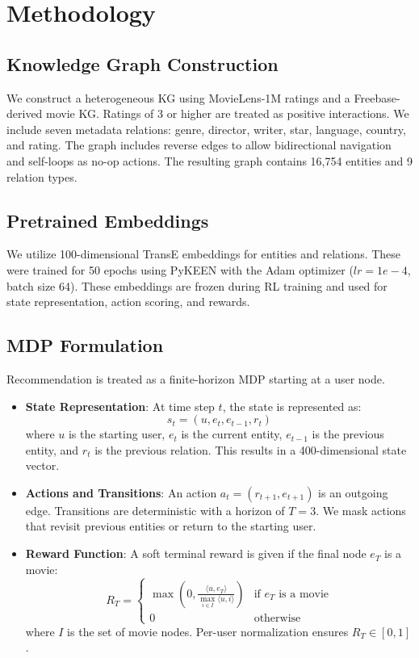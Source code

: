\documentclass{article}
\begin{document}
\section{Methodology}

\subsection{Knowledge Graph Construction}
We construct a heterogeneous KG using MovieLens-1M ratings and a Freebase-derived movie KG. Ratings of 3 or higher are treated as positive interactions. We include seven 
metadata relations: genre, director, writer, star, language, country, and rating. The graph includes reverse edges to allow bidirectional navigation and self-loops as no-op 
actions. The resulting graph contains 16,754 entities and 9 relation types.

\subsection{Pretrained Embeddings}
We utilize 100-dimensional TransE embeddings for entities and relations. These were trained for 50 epochs using PyKEEN with the Adam optimizer ($lr=1e-4$, batch size 64). 
These embeddings are frozen during RL training and used for state representation, action scoring, and rewards.

\subsection{MDP Formulation}
Recommendation is treated as a finite-horizon MDP starting at a user node.

\begin{itemize}
    \item \textbf{State Representation}: At time step $t$, the state is represented as:
        \begin{equation}
            s_t = (u, e_t, e_{t-1}, r_t)
        \end{equation}
        where $u$ is the starting user, $e_t$ is the current entity, $e_{t-1}$ is the previous entity, and $r_t$ is the previous relation. This results in a 400-dimensional state vector.
    \item \textbf{Actions and Transitions}: An action $a_t = (r_{t+1}, e_{t+1})$ is an outgoing edge. Transitions are deterministic with a horizon of $T=3$. We mask actions that 
        revisit previous entities or return to the starting user.
    \item \textbf{Reward Function}: A soft terminal reward is given if the final node $e_T$ is a movie:
        \begin{equation}
            R_T = 
            \begin{cases} 
            \max\left(0, \frac{\langle u, e_T \rangle}{\max_{i \in I} \langle u, i \rangle}\right) & \text{if } e_T \text{ is a movie} \\
            0 & \text{otherwise} 
            \end{cases}
        \end{equation}
        where $I$ is the set of movie nodes. Per-user normalization ensures $R_T \in [0, 1]$.
\end{itemize}
\end{document}

